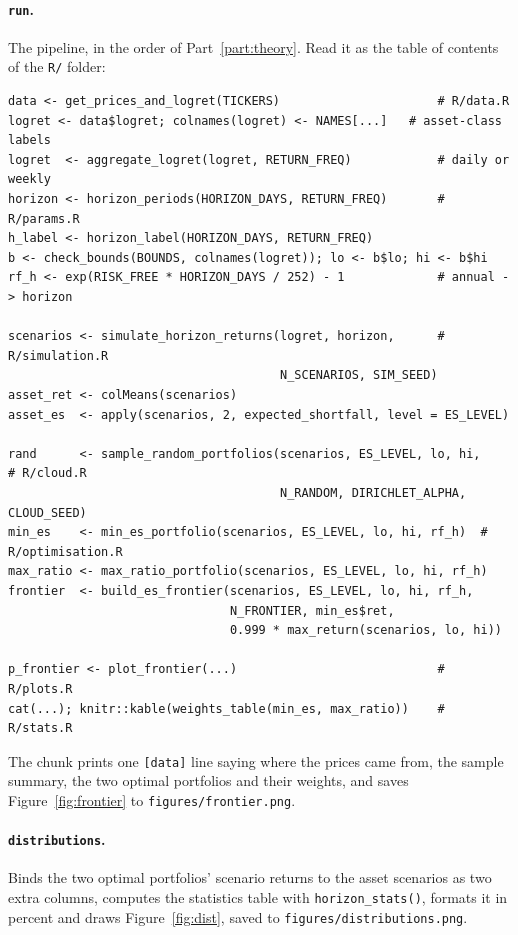 \documentclass[11pt,a4paper]{article}
\newcommand{\code}[1]{\texttt{#1}}
\newcommand{\file}[1]{\texttt{#1}}
\theoremstyle{plain}
\theoremstyle{remark}
\begin{document}
\paragraph{\code{run}.} The pipeline, in the order of Part~\ref{part:theory}.
Read it as the table of contents of the \file{R/} folder:
\begin{verbatim}
data <- get_prices_and_logret(TICKERS)                      # R/data.R
logret <- data$logret; colnames(logret) <- NAMES[...]   # asset-class labels
logret  <- aggregate_logret(logret, RETURN_FREQ)            # daily or weekly
horizon <- horizon_periods(HORIZON_DAYS, RETURN_FREQ)       # R/params.R
h_label <- horizon_label(HORIZON_DAYS, RETURN_FREQ)
b <- check_bounds(BOUNDS, colnames(logret)); lo <- b$lo; hi <- b$hi
rf_h <- exp(RISK_FREE * HORIZON_DAYS / 252) - 1             # annual -> horizon

scenarios <- simulate_horizon_returns(logret, horizon,      # R/simulation.R
                                      N_SCENARIOS, SIM_SEED)
asset_ret <- colMeans(scenarios)
asset_es  <- apply(scenarios, 2, expected_shortfall, level = ES_LEVEL)

rand      <- sample_random_portfolios(scenarios, ES_LEVEL, lo, hi,       # R/cloud.R
                                      N_RANDOM, DIRICHLET_ALPHA, CLOUD_SEED)
min_es    <- min_es_portfolio(scenarios, ES_LEVEL, lo, hi, rf_h)  # R/optimisation.R
max_ratio <- max_ratio_portfolio(scenarios, ES_LEVEL, lo, hi, rf_h)
frontier  <- build_es_frontier(scenarios, ES_LEVEL, lo, hi, rf_h,
                               N_FRONTIER, min_es$ret,
                               0.999 * max_return(scenarios, lo, hi))

p_frontier <- plot_frontier(...)                            # R/plots.R
cat(...); knitr::kable(weights_table(min_es, max_ratio))    # R/stats.R
\end{verbatim}
The chunk prints one \code{[data]} line saying where the prices came from,
the sample summary, the two optimal portfolios and their weights, and saves
Figure~\ref{fig:frontier} to \file{figures/frontier.png}.

\paragraph{\code{distributions}.} Binds the two optimal portfolios' scenario
returns to the asset scenarios as two extra columns, computes the statistics
table with \code{horizon\_stats()}, formats it in percent and draws
Figure~\ref{fig:dist}, saved to \file{figures/distributions.png}.
\end{document}
